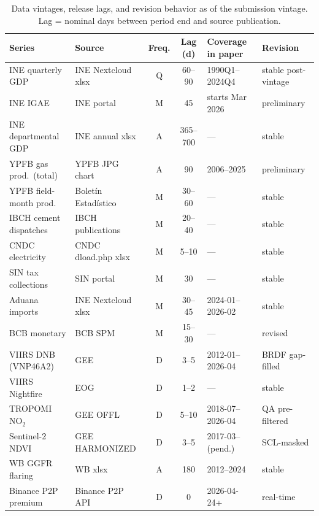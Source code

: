 \begin{table}[H]
\centering\scriptsize
\caption{Data vintages, release lags, and revision behavior as of the submission vintage. Lag = nominal days between period end and source publication.}
\label{tab:vintages}
\begin{tabular}{p{3.0cm}p{3.0cm}cclp{2.2cm}}
\toprule
Series & Source & Freq. & Lag (d) & Coverage in paper & Revision \\
\midrule
INE quarterly GDP & INE Nextcloud xlsx & Q & 60--90 & 1990Q1--2024Q4 & stable post-vintage \\
INE IGAE & INE portal & M & 45 & starts Mar 2026 & preliminary \\
INE departmental GDP & INE annual xlsx & A & 365--700 & --- & stable \\
YPFB gas prod.\ (total) & YPFB JPG chart & A & 90 & 2006--2025 & preliminary \\
YPFB field-month prod. & Boletín Estadístico & M & 30--60 & --- & stable \\
IBCH cement dispatches & IBCH publications & M & 20--40 & --- & stable \\
CNDC electricity & CNDC dload.php xlsx & M & 5--10 & --- & stable \\
SIN tax collections & SIN portal & M & 30 & --- & stable \\
Aduana imports & INE Nextcloud xlsx & M & 30--45 & 2024-01--2026-02 & stable \\
BCB monetary & BCB SPM & M & 15--30 & --- & revised \\
VIIRS DNB (VNP46A2) & GEE & D & 3--5 & 2012-01--2026-04 & BRDF gap-filled \\
VIIRS Nightfire & EOG & D & 1--2 & --- & stable \\
TROPOMI NO$_2$ & GEE OFFL & D & 5--10 & 2018-07--2026-04 & QA pre-filtered \\
Sentinel-2 NDVI & GEE HARMONIZED & D & 3--5 & 2017-03--(pend.) & SCL-masked \\
WB GGFR flaring & WB xlsx & A & 180 & 2012--2024 & stable \\
Binance P2P premium & Binance P2P API & D & 0 & 2026-04-24+ & real-time \\
\bottomrule
\end{tabular}
\end{table}